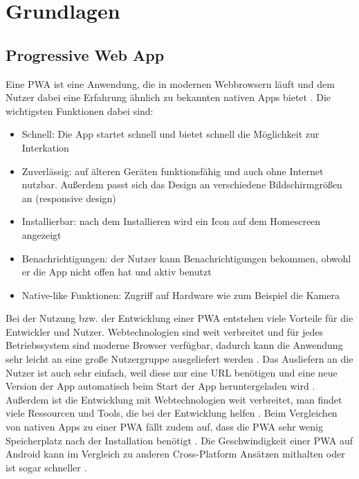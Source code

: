 \chapter{Grundlagen}
\label{Kap2}

\section{Progressive Web App}
Eine \ac{PWA} ist eine Anwendung, die in modernen Webbrowsern läuft und dem Nutzer dabei eine Erfahrung ähnlich zu bekannten nativen Apps bietet \autocite{Sheppard2017} \autocite{Rojas2020}. Die wichtigsten Funktionen dabei sind:

\begin{itemize}
  \item Schnell: Die App startet schnell und bietet schnell die Möglichkeit zur Interkation \autocite{Hajian2019} \autocite{Sheppard2017}
  \item Zuverlässig: auf älteren Geräten funktionsfähig und auch ohne Internet nutzbar. Außerdem passt sich das Design an verschiedene Bildschirmgrößen an (responsive design) \autocite{Hajian2019} \autocite{Sheppard2017}
  \item Installierbar: nach dem Installieren wird ein Icon auf dem Homescreen angezeigt \autocite{Hajian2019} \autocite{Sheppard2017} \autocite{Rojas2020}
  \item Benachrichtigungen: der Nutzer kann Benachrichtigungen bekommen, obwohl er die App nicht offen hat und aktiv benutzt \autocite{Hajian2019} \autocite{Sheppard2017} 
  \item Native-like Funktionen: Zugriff auf Hardware wie zum Beispiel die Kamera \autocite{Hajian2019}
\end{itemize}

Bei der Nutzung bzw. der Entwicklung einer \ac{PWA} entstehen viele Vorteile für die Entwickler und Nutzer. Webtechnologien sind weit verbreitet und für jedes Betriebssystem sind moderne Browser verfügbar, dadurch kann die Anwendung sehr leicht an eine große Nutzergruppe ausgeliefert werden \autocite{Rojas2020}. Das Ausliefern an die Nutzer ist auch sehr einfach, weil diese nur eine URL benötigen \autocite{KHAN2019289} und eine neue Version der App automatisch beim Start der App heruntergeladen wird \autocite{Rojas2020}. Außerdem ist die Entwicklung mit Webtechnologien weit verbreitet, man findet viele Ressourcen und Tools, die bei der Entwicklung helfen \autocite{Rojas2020}. Beim Vergleichen von nativen Apps zu einer \ac{PWA} fällt zudem auf, dass die \ac{PWA} sehr wenig Speicherplatz nach der Installation benötigt \autocite{biorn2017} \autocite{KHAN2019289}. Die Geschwindigkeit einer \ac{PWA} auf Android kann im Vergleich zu anderen Cross-Platform Ansätzen mithalten oder ist sogar schneller \autocite{biorn2017}.

